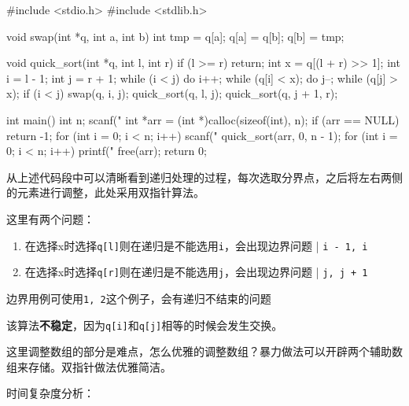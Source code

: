 \begin{mycpptwocol}
    #include <stdio.h>
    #include <stdlib.h>
    
    void swap(int *q, int a, int b)
    {
        int tmp = q[a];
        q[a] = q[b];
        q[b] = tmp;
    }
    
    void quick_sort(int *q, int l, int r)
    {
        if (l >= r) {
            return;
        }
        int x = q[(l + r) >> 1];
        int i = l - 1;
        int j = r + 1;
        while (i < j) {
            do i++; while (q[i] < x);
            do j--; while (q[j] > x);
            if (i < j) {
                swap(q, i, j);
            }
        }
        quick_sort(q, l, j);
        quick_sort(q, j + 1, r);
    }
    
    int main()
    {
        int n;
        scanf("%
        int *arr = (int *)calloc(sizeof(int), n);
        if (arr == NULL) {
            return -1;
        }
        for (int i = 0; i < n; i++) {
            scanf("%
        }
        quick_sort(arr, 0, n - 1);
        for (int i = 0; i < n; i++) {
            printf("%
        }
        free(arr);
        return 0;
    }
\end{mycpptwocol}

从上述代码段中可以清晰看到递归处理的过程，每次选取分界点，之后将左右两侧的元素进行调整，此处采用双指针算法。

\begin{keypoint}
    这里有两个问题：
    \begin{enumerate}
        \item 在选择x时选择\lstinline{q[l]}则在递归是不能选用\lstinline{i}，会出现边界问题 | \lstinline{i - 1, i}
        \item 在选择x时选择\lstinline{q[r]}则在递归是不能选用\lstinline{j}，会出现边界问题 | \lstinline{j, j + 1}
    \end{enumerate}

    边界用例可使用\lstinline{1, 2}这个例子，会有递归不结束的问题
\end{keypoint}

\begin{information}
  该算法\textbf{不稳定}，因为\lstinline{q[i]}和\lstinline{q[j]}相等的时候会发生交换。

  这里调整数组的部分是难点，怎么优雅的调整数组？暴力做法可以开辟两个辅助数组来存储。双指针做法优雅简洁。
\end{information}

时间复杂度分析：

